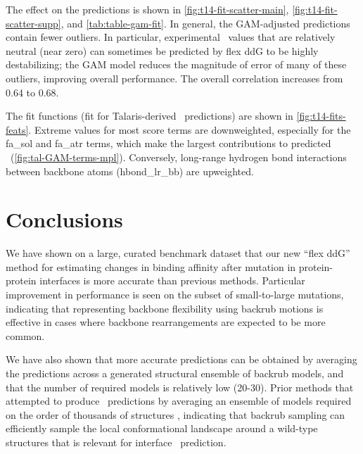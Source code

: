 The effect on the predictions is shown in \cref{fig:t14-fit-scatter-main}, \cref{fig:t14-fit-scatter-supp}, and \cref{tab:table-gam-fit}. In general, the GAM-adjusted predictions contain fewer outliers. In particular, experimental \ddg\ values that are relatively neutral (near zero) can sometimes be predicted by flex ddG to be highly destabilizing; the GAM model reduces the magnitude of error of many of these outliers, improving overall performance. The overall correlation increases from 0.64 to 0.68.

The fit functions (fit for Talaris-derived \ddg\ predictions) are shown in \cref{fig:t14-fits-feats}. Extreme values for most score terms are downweighted, especially for the fa\_sol and fa\_atr terms, which make the largest contributions to predicted \ddg\ (\cref{fig:tal-GAM-terms-mpl}). Conversely, long-range hydrogen bond interactions between backbone atoms (hbond\_lr\_bb) are upweighted.

\section{Conclusions}

We have shown on a large, curated benchmark dataset that our new ``flex ddG'' method for estimating changes in binding affinity after mutation in protein-protein interfaces is more accurate than previous methods.
Particular improvement in performance is seen on the subset of small-to-large mutations, indicating that representing backbone flexibility using backrub motions is effective in cases where backbone rearrangements are expected to be more common.

We have also shown that more accurate predictions can be obtained by averaging the predictions across a generated structural ensemble of backrub models, and that the number of required models is relatively low (20-30).
Prior methods that attempted to produce \ddg\ predictions by averaging an ensemble of models required on the order of thousands of structures  \cite{benedix_predicting_2009}, indicating that backrub sampling can efficiently sample the local conformational landscape around a wild-type structures that is relevant for interface \ddg\ prediction.


